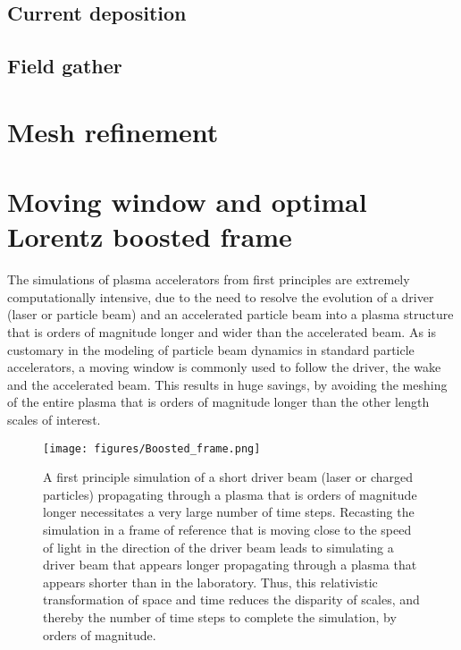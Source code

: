 \documentclass[]{report}
\begin{document}
\subsection{Current deposition}


\subsection{Field gather}


\section{Mesh refinement}


\section{Moving window and optimal Lorentz boosted frame}
The simulations of plasma accelerators from first principles are extremely computationally intensive, due to the need to resolve the evolution of a driver (laser or particle beam) and an accelerated particle beam into a plasma structure that is orders of magnitude longer and wider than the accelerated beam. As is customary in the modeling of particle beam dynamics in standard particle accelerators, a moving window is commonly used to follow the driver, the wake and the accelerated beam. This results in huge savings, by avoiding the meshing of the entire plasma that is orders of magnitude longer than the other length scales of interest. 

\begin{figure}
\texttt{[image: figures/Boosted\_frame.png]}
\caption{\label{fig:PIC} A first principle simulation of a short driver beam (laser or charged particles) propagating through a plasma that is orders of magnitude longer necessitates a very large number of time steps. Recasting the simulation in a frame of reference that is moving close to the speed of light in the direction of the driver beam leads to simulating a driver beam that appears longer propagating through a plasma that appears shorter than in the laboratory. Thus, this relativistic transformation of space and time reduces the disparity of scales, and thereby the number of time steps to complete the simulation, by orders of magnitude.}
\end{figure}
\end{document}
